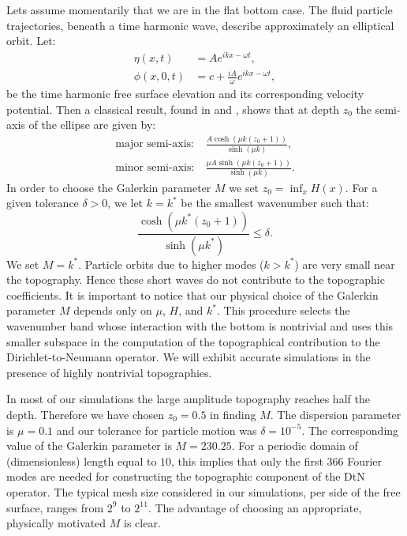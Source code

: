 Lets assume momentarily that we are in the flat bottom case. The fluid particle trajectories, beneath a time harmonic wave, 
describe approximately an elliptical orbit. Let:
\begin{equation*}
\begin{aligned}
\eta(x,t) &= Ae^{ikx-\omega t},\\
\phi(x,0,t) &= c + \tfrac{iA}{\omega}e^{ikx-\omega t},
\end{aligned}
\end{equation*}
be the time harmonic free surface elevation and its corresponding velocity potential. 
Then a classical result, found in \cite{Constantin} and \cite{DeanDalrymple}, shows that at depth $z_0$
the semi-axis of the ellipse are given by:
\begin{equation*}
\begin{aligned}
\text{major semi-axis}: &\ \frac{A\cosh(\mu k(z_0+1))}{\sinh(\mu k)},\\
\text{minor semi-axis}: &\ \frac{\mu A\sinh(\mu k(z_0+1))}{\sinh(\mu k)}.
\end{aligned}
\end{equation*}
In order to choose the Galerkin parameter $M$ we set $z_0 = \inf_x H(x)$. For a 
given tolerance $\delta>0$, we let $k = k^\ast$ be the smallest wavenumber such that:
\begin{equation*}
\frac{\cosh(\mu k^\ast (z_0+1))}{\sinh(\mu k^\ast)} \leq \delta.
\end{equation*}
We set $M = k^\ast$. 
Particle orbits due to higher modes ($k > k^\ast$) are very small near the topography.  
Hence these short waves do not contribute to the topographic coefficients.
It is important to notice that our physical choice of the Galerkin parameter $M$ depends only on $\mu$, $H$, and $k^\ast$. 
This procedure selects the wavenumber band whose interaction with the bottom is nontrivial and uses this smaller subspace 
in the computation of the topographical contribution to the Dirichlet-to-Neumann operator. We will exhibit 
accurate simulations in the presence of  highly nontrivial topographies.

In most of our simulations the large amplitude topography reaches half the depth. 
Therefore we have chosen $z_0 = 0.5$ in finding $M$.  
The dispersion parameter is $\mu = 0.1$  and  our tolerance for particle motion was $\delta = 10^{-5}$. 
The corresponding value of the Galerkin parameter is $M = 230.25$. 
For a periodic domain of (dimensionless) length equal to $10$, this implies that only the first $366$ 
Fourier modes are needed for constructing the topographic component of the DtN operator. 
The typical mesh size considered in our simulations,
per side of the free surface, 
ranges from $2^{9}$ to $2^{11}$. The advantage of choosing an appropriate,
physically motivated $M$ is clear.


